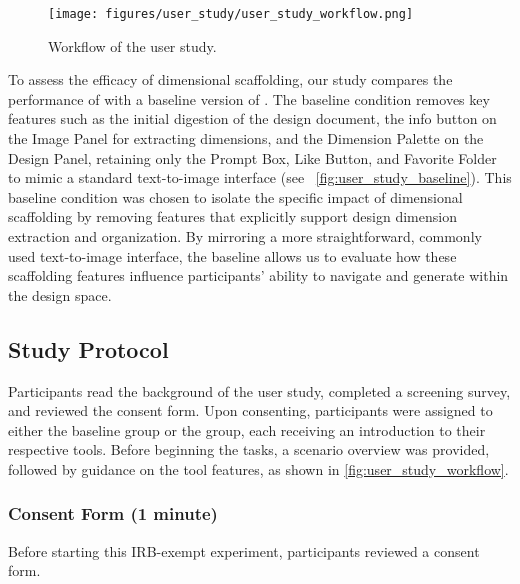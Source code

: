 \begin{figure*}[htbp]
    \centering
    \texttt{[image: figures/user\_study/user\_study\_workflow.png]}
    \caption{Workflow of the user study.}
    \label{fig:user_study_workflow}
\end{figure*}

To assess the efficacy of dimensional scaffolding, our study compares the performance of \toolname{} with a baseline version of \toolname{}. The baseline condition removes key features such as the initial digestion of the design document, the info button on the Image Panel for extracting dimensions, and the Dimension Palette on the Design Panel, retaining only the Prompt Box, Like Button, and Favorite Folder to mimic a standard text-to-image interface (see ~\autoref{fig:user_study_baseline}). This baseline condition was chosen to isolate the specific impact of dimensional scaffolding by removing features that explicitly support design dimension extraction and organization. By mirroring a more straightforward, commonly used text-to-image interface, the baseline allows us to evaluate how these scaffolding features influence participants' ability to navigate and generate within the design space.


\subsection{Study Protocol}

Participants read the background of the user study, completed a screening survey, and reviewed the consent form. Upon consenting, participants were assigned to either the baseline group or the \toolname{} group, each receiving an introduction to their respective tools. Before beginning the tasks, a scenario overview was provided, followed by guidance on the tool features, as shown in \autoref{fig:user_study_workflow}.

\subsubsection{Consent Form (1 minute)}
Before starting this IRB-exempt experiment, participants reviewed a consent form. 

